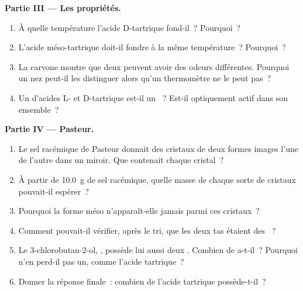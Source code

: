\begin{problem}
\medskip
\noindent\textbf{Partie III --- Les propriétés.}
\begin{enumerate}[resume]
  \item À quelle température l'acide D-tartrique fond-il~? Pourquoi~?
  \item L'acide méso-tartrique doit-il fondre à la même température~?
        Pourquoi~?
  \item La carvone montre que deux  peuvent avoir des odeurs
        différentes. Pourquoi un nez peut-il les distinguer alors qu'un
        thermomètre ne le peut pas~?
  \item Un  d'acides L- et D-tartrique est-il un ~? Est-il optiquement actif dans son ensemble~?
\end{enumerate}

\medskip
\noindent\textbf{Partie IV --- Pasteur.}
\begin{enumerate}[resume]
  \item Le sel racémique de Pasteur donnait des cristaux de deux formes
        images l'une de l'autre dans un miroir. Que contenait chaque
        cristal~?
  \item À partir de \qty{10.0}{g} de sel racémique, quelle masse de
        chaque sorte de cristaux pouvait-il espérer~?
  \item Pourquoi la forme méso n'apparaît-elle jamais parmi ces
        cristaux~?
  \item Comment pouvait-il vérifier, après le tri, que les deux tas
        étaient des ~?
  \item Le 3-chlorobutan-2-ol, , possède lui aussi
        deux . Combien de  a-t-il~?
        Pourquoi n'en perd-il pas un, comme l'acide tartrique~?
  \item Donner la réponse finale~: combien de  l'acide
        tartrique possède-t-il~?
\end{enumerate}
\end{problem}
